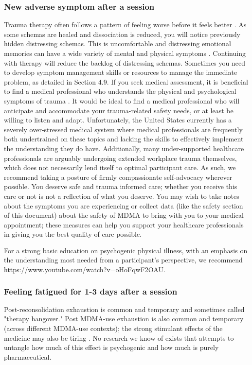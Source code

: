 \documentclass[12pt,letterpaper]{article}
\begin{document}
\subsubsection{New adverse symptom after a session}
Trauma therapy often follows a pattern of feeling worse before it feels better \cite{vanderKolkBody}. As some schemas are healed and dissociation is reduced, you will notice previously hidden distressing schemas. This is uncomfortable and distressing emotional memories can have a wide variety of mental and physical symptoms \cite{kroenkeSomatic,henningsenSomatic}. Continuing with therapy will reduce the backlog of distressing schemas. Sometimes you need to develop symptom management skills or resources to manage the immediate problem, as detailed in Section 4.9. If you seek medical assessment, it is beneficial to find a medical professional who understands the physical and psychological symptoms of trauma \todo{[107]}. It would be ideal to find a medical professional who will anticipate and accommodate your trauma-related safety needs, or at least be willing to listen and adapt. Unfortunately, the United States currently has a severely over-stressed medical system where medical professionals are frequently both undertrained on these topics and lacking the skills to effectively implement the understanding they do have. Additionally, many under-supported healthcare professionals are arguably undergoing extended workplace trauma themselves, which does not necessarily lend itself to optimal participant care. As such, we recommend taking a posture of firmly compassionate self-advocacy wherever possible. You deserve safe and trauma informed care; whether you receive this care or not is not a reflection of what you deserve. You may wish to take notes about the symptoms you are experiencing or collect data (like the safety section of this document) about the safety of MDMA to bring with you to your medical appointment; these measures can help you support your healthcare professionals in giving you the best quality of care possible. 

For a strong basic education on psychogenic physical illness, with an emphasis on the understanding most needed from a participant's perspective, we recommend https://www.youtube.com/watch?v=oHoFqwF2OAU. 
\subsubsection{Feeling fatigued for 1-3 days after a session}
Post-reconsolidation exhaustion is common and temporary and sometimes called "therapy hangover." Post MDMA-use exhaustion is also common and temporary (across different MDMA-use contexts); the strong stimulant effects of the medicine may also be tiring . No research we know of exists that attempts to untangle how much of this effect is psychogenic and how much is purely pharmaceutical. 
\end{document}
